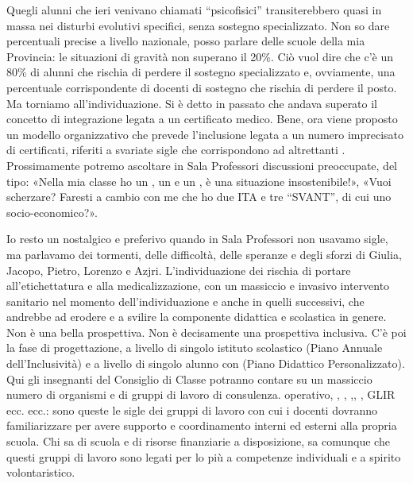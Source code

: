 Quegli alunni che ieri venivano chiamati “psicofisici” transiterebbero quasi in massa nei disturbi evolutivi specifici, senza sostegno specializzato. Non so dare percentuali precise a livello nazionale, posso parlare delle scuole della mia Provincia: le situazioni di gravità non superano il 20\%. Ciò vuol dire che c'è un 80\% di alunni che rischia di perdere il sostegno specializzato e, ovviamente, una percentuale corrispondente di docenti di sostegno che rischia di perdere il posto.
Ma torniamo all'individuazione. Si è detto in passato che andava superato il concetto di integrazione legata a un certificato medico. Bene, ora viene proposto un modello organizzativo che prevede l'inclusione legata a un numero imprecisato di certificati, riferiti a svariate sigle che corrispondono ad altrettanti . Prossimamente potremo ascoltare in Sala Professori discussioni preoccupate, del tipo: «Nella mia classe ho un , un  e un , è una situazione insostenibile!», «Vuoi scherzare? Faresti a cambio con me che ho due ITA  e tre “SVANT”, di cui uno socio-economico?».

Io resto un nostalgico e preferivo quando in Sala Professori non usavamo sigle, ma parlavamo dei tormenti, delle difficoltà, delle speranze e degli sforzi di Giulia, Jacopo, Pietro, Lorenzo e Azjri. L'individuazione dei  rischia di portare all'etichettatura e alla medicalizzazione, con un massiccio e invasivo intervento sanitario nel momento dell'individuazione e anche in quelli successivi, che andrebbe ad erodere e a svilire la componente didattica e scolastica in genere. Non è una bella prospettiva. Non è decisamente una prospettiva inclusiva.
C'è poi la fase di progettazione, a livello di singolo istituto scolastico (Piano Annuale dell'Inclusività) e a livello di singolo alunno con  (Piano Didattico Personalizzato). Qui gli insegnanti del Consiglio di Classe potranno contare su un massiccio numero di organismi e di gruppi di lavoro di consulenza.   operativo, , , ,, , GLIR ecc. ecc.: sono queste le sigle dei gruppi di lavoro con cui i docenti dovranno familiarizzare per avere supporto e coordinamento interni ed esterni alla propria scuola. Chi sa di scuola e di risorse finanziarie a disposizione, sa comunque che questi gruppi di lavoro sono legati per lo più a competenze individuali e a spirito volontaristico.

